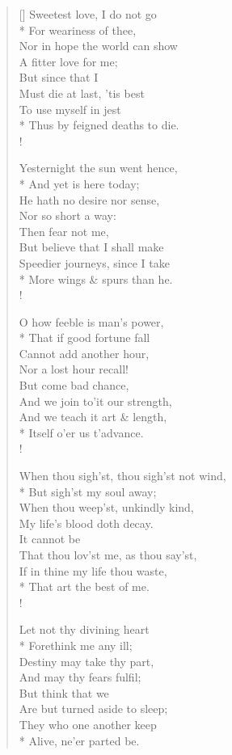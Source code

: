 \documentclass[MAIN]{subfiles}
\begin{document}
\settowidth{\versewidth}{\vin \vin Thus by feigned deaths to die.}
\begin{verse}[\versewidth]
Sweetest love, I do not go\\*
\vin For weariness of thee,\\
Nor in hope the world can show\\
\vin A fitter love for me;\\
\vin \vin But since that I\\
Must die at last, 'tis best\\
To use myself in jest\\*
\vin \vin Thus by feigned deaths to die.\\!

Yesternight the sun went hence,\\*
\vin And yet is here today;\\
He hath no desire nor sense,\\
\vin Nor  so short a way:\\
\vin \vin Then fear not me,\\
But believe that I shall make\\
Speedier journeys, since I take\\*
\vin \vin More wings \& spurs than he.\\!

O how feeble is man's power,\\*
\vin That if good fortune fall\\
Cannot add another hour,\\
\vin Nor a lost hour recall!\\
\vin \vin But come bad chance,\\
And we join to'it our strength,\\
And we teach it art \& length,\\*
\vin \vin Itself o'er us t'advance.\\!

When thou sigh'st, thou sigh'st not wind,\\*
\vin But sigh'st my soul away;\\
When thou weep'st, unkindly kind,\\
\vin My life's blood doth decay.\\
\vin \vin It cannot be\\
That thou lov'st me, as thou say'st,\\
If in thine my life thou waste,\\*
\vin \vin That art the best of me.\\!

Let not thy divining heart\\*
\vin Forethink me any ill;\\
Destiny may take thy part,\\
\vin And may thy fears fulfil;\\
\vin \vin But think that we\\
Are but turned aside to sleep;\\
They who one another keep\\*
\vin \vin Alive, ne'er parted be. 
\end{verse}
\end{document}
